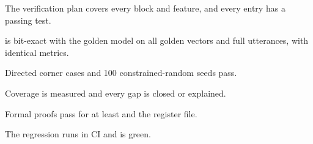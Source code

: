 \begin{donebox}
\begin{checklist}
  \item The verification plan covers every block and feature, and every entry has a passing test.
  \item {} is bit-exact with the golden model on all golden vectors and full utterances, with identical metrics.
  \item Directed corner cases and 100 constrained-random seeds pass.
  \item Coverage is measured and every gap is closed or explained.
  \item Formal proofs pass for at least  and the register file.
  \item The regression runs in CI and is green.
\end{checklist}
\end{donebox}
